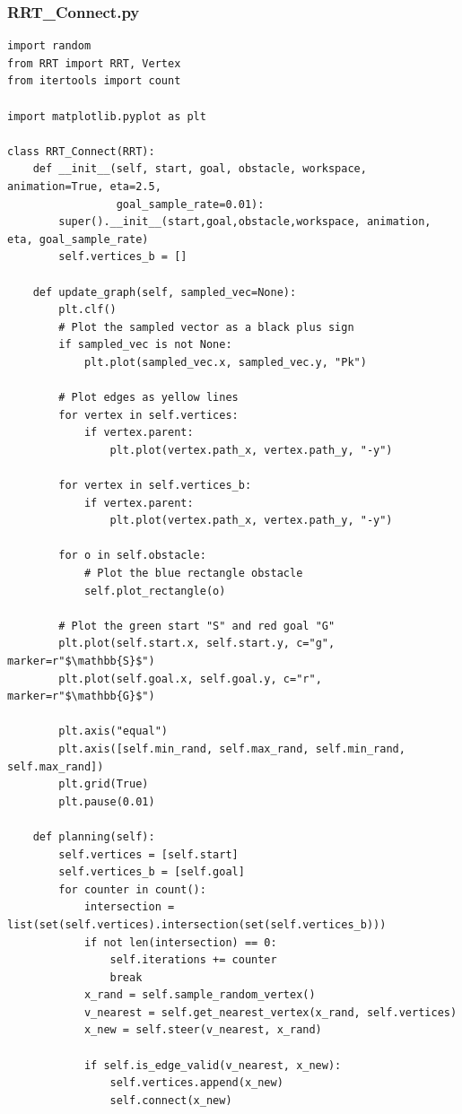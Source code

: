 \documentclass{article}
\begin{document}
\subsubsection{RRT\_Connect.py}
\begin{verbatim}
import random
from RRT import RRT, Vertex
from itertools import count

import matplotlib.pyplot as plt

class RRT_Connect(RRT):
    def __init__(self, start, goal, obstacle, workspace, animation=True, eta=2.5,
                 goal_sample_rate=0.01):
        super().__init__(start,goal,obstacle,workspace, animation, eta, goal_sample_rate)
        self.vertices_b = []

    def update_graph(self, sampled_vec=None):
        plt.clf()
        # Plot the sampled vector as a black plus sign
        if sampled_vec is not None:
            plt.plot(sampled_vec.x, sampled_vec.y, "Pk")

        # Plot edges as yellow lines
        for vertex in self.vertices:
            if vertex.parent:
                plt.plot(vertex.path_x, vertex.path_y, "-y")

        for vertex in self.vertices_b:
            if vertex.parent:
                plt.plot(vertex.path_x, vertex.path_y, "-y")

        for o in self.obstacle:
            # Plot the blue rectangle obstacle
            self.plot_rectangle(o)

        # Plot the green start "S" and red goal "G"
        plt.plot(self.start.x, self.start.y, c="g", marker=r"$\mathbb{S}$")
        plt.plot(self.goal.x, self.goal.y, c="r", marker=r"$\mathbb{G}$")

        plt.axis("equal")
        plt.axis([self.min_rand, self.max_rand, self.min_rand, self.max_rand])
        plt.grid(True)
        plt.pause(0.01)

    def planning(self):
        self.vertices = [self.start]
        self.vertices_b = [self.goal]
        for counter in count():  
            intersection = list(set(self.vertices).intersection(set(self.vertices_b)))
            if not len(intersection) == 0:
                self.iterations += counter
                break
            x_rand = self.sample_random_vertex()
            v_nearest = self.get_nearest_vertex(x_rand, self.vertices)
            x_new = self.steer(v_nearest, x_rand)

            if self.is_edge_valid(v_nearest, x_new):
                self.vertices.append(x_new)
                self.connect(x_new)


\end{verbatim}
\end{document}
